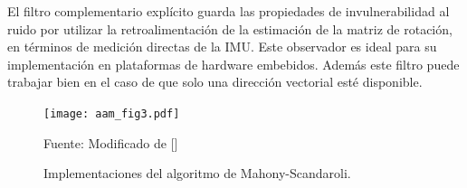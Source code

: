 \documentclass[10pt]{report}
\numberwithin{equation}{chapter}
\numberwithin{algorithm}{chapter}
\begin{document}
El filtro complementario explícito guarda las propiedades de invulnerabilidad al ruido por utilizar la retroalimentación de la estimación de la matriz de rotación, en términos de medición directas de la IMU. Este observador es ideal para su implementación en plataformas de hardware embebidos. Además este filtro puede trabajar bien en el caso de que solo una dirección vectorial esté disponible.\par
\begin{figure}
\begin{center}
\texttt{[image: aam\_fig3.pdf]}
\caption{Implementaciones del algoritmo de Mahony-Scandaroli.}
\scriptsize{Fuente: Modificado de [\cite{Mahony2008,Scandaro2011a}]}
\label{aam_fig2}
\end{center}
\end{figure}
\end{document}
